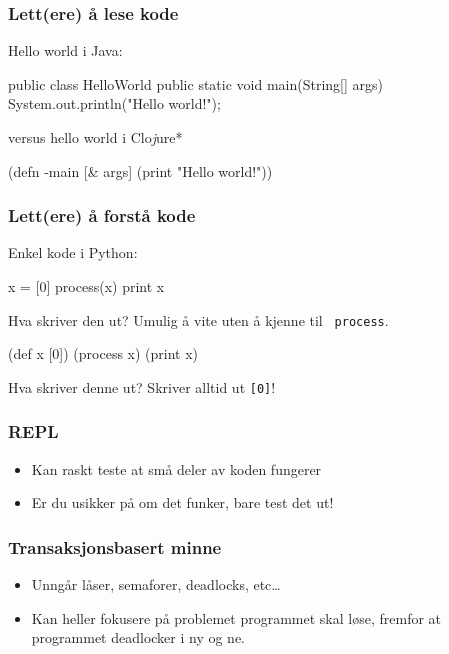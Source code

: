 \documentclass{beamer}
\begin{document}
\begin{frame}[fragile]
  \frametitle{Lett(ere) å lese kode}

  Hello world i Java:
  \vspace{3mm}
  \begin{javacode}
public class HelloWorld {
  public static void main(String[] args){
    System.out.println("Hello world!");
  }
}
  \end{javacode}

  versus hello world i Clo{\em j}ure*
  \vspace{3mm}
  \begin{cljcode}
(defn -main [& args]
  (print "Hello world!"))
  \end{cljcode}
\end{frame}

\begin{frame}[fragile]
  \frametitle{Lett(ere) å forstå kode}
Enkel kode i Python:
\vspace{2mm}
  \begin{pycode}
x = [0]
process(x)
print x
  \end{pycode}

\pause Hva skriver den ut? \pause Umulig å vite uten å kjenne til {\tt
  process}. \pause
\vspace{3mm}
  \begin{cljcode}
(def x [0])
(process x)
(print x)
  \end{cljcode}

Hva skriver denne ut? \pause Skriver alltid ut {\tt [0]}!
\end{frame}

\begin{frame}
  \frametitle{REPL}

  \begin{itemize}
  \item<1-> Kan raskt teste at små deler av koden fungerer
  \item<2-> Er du usikker på om det funker, bare test det ut!
  \end{itemize}
\end{frame}

\begin{frame}
  \frametitle{Transaksjonsbasert minne}

  \begin{itemize}
  \item<1-> Unngår låser, semaforer, deadlocks, etc\ldots
  \item<2-> Kan heller fokusere på problemet programmet skal løse, fremfor at
    programmet deadlocker i ny og ne.
  \end{itemize}
\end{frame}
\end{document}
